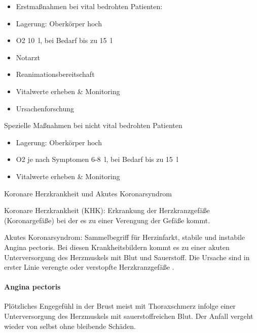 \documentclass{article}
\begin{document}
\begin{itemize}
\item Erstma{\ss}nahmen bei vital bedrohten Patienten: 

\end{itemize}
\begin{itemize}
\item Lagerung: Oberk\"orper hoch

\item O2 10~l, bei Bedarf bis zu 15~l

\item Notarzt

\item Reanimationsbereitschaft

\item Vitalwerte erheben \& Monitoring 

\end{itemize}
\begin{itemize}
\item Ursachenforschung

\end{itemize}
Spezielle Ma{\ss}nahmen bei nicht vital bedrohten Patienten

\begin{itemize}
\item Lagerung: Oberk\"orper hoch

\item O2 je nach Symptomen 6-8~l, bei Bedarf bis zu 15~l

\item Vitalwerte erheben \& Monitoring 

\end{itemize}
Koronare Herzkrankheit und Akutes Koronarsyndrom

Koronare Herzkrankheit (KHK):
Erkrankung der Herzkranzgef\"a{\ss}e (Koronargef\"a{\ss}e) bei der es
zu einer Verengung der Gef\"a{\ss}e kommt.

Akutes Koronarsyndrom: Sammelbegriff f\"ur
Herzinfarkt, stabile und instabile Angina pectoris. Bei diesen
Krankheitsbildern kommt es zu einer akuten Unterversorgung des
Herzmuskels mit Blut und Sauerstoff. Die Ursache sind in erster Linie
verengte oder verstopfte Herzkranzgef\"a{\ss}e . 

\paragraph[Angina pectoris]{Angina pectoris}
Pl\"otzliches Engegef\"uhl in der Brust meist mit
Thoraxschmerz infolge einer Unter\-ver\-sorgung des Herzmuskels mit
sauerstoffreichen Blut. Der Anfall vergeht wieder von selbst ohne
bleibende Sch\"aden.
\end{document}
